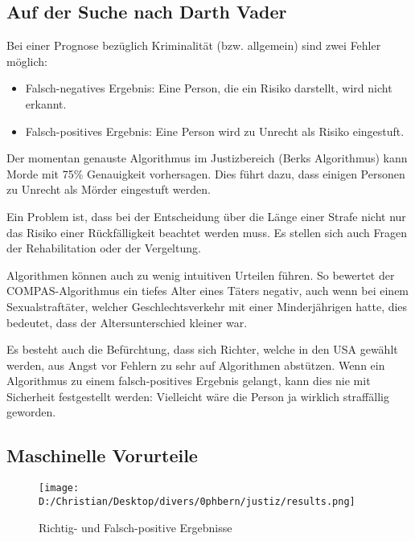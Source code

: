 \documentclass{article}
\begin{document}
\subsection*{Auf der Suche nach Darth Vader}

Bei einer Prognose bezüglich Kriminalität (bzw. allgemein) sind zwei Fehler möglich: 
 
		\begin{itemize}
			\item Falsch-negatives Ergebnis: Eine Person, die ein Risiko darstellt, 
						wird nicht erkannt. 		
			\item Falsch-positives Ergebnis: Eine Person wird zu Unrecht als 
						Risiko eingestuft. 
	\end{itemize}

Der momentan genauste Algorithmus im Justizbereich (Berks Algorithmus) kann Morde mit 75\% Genauigkeit vorhersagen. Dies führt dazu, dass einigen Personen zu Unrecht als Mörder eingestuft werden. 

Ein Problem ist, dass bei der Entscheidung über die Länge einer Strafe nicht nur das Risiko einer Rückfälligkeit beachtet werden muss. Es stellen sich auch Fragen der Rehabilitation oder der Vergeltung.  

Algorithmen können auch zu wenig intuitiven Urteilen führen. So bewertet der COMPAS-Algorithmus ein tiefes Alter eines Täters negativ, auch wenn bei einem Sexualstraftäter, welcher Geschlechtsverkehr mit einer Minderjährigen hatte, dies bedeutet, dass der Altersunterschied kleiner war. 

Es besteht auch die Befürchtung, dass sich Richter, welche in den USA gewählt werden, aus Angst vor Fehlern zu sehr auf Algorithmen abstützen. Wenn ein Algorithmus zu einem falsch-positives Ergebnis gelangt, kann dies nie mit Sicherheit festgestellt werden: Vielleicht wäre die Person ja wirklich straffällig geworden. 

\subsection*{Maschinelle Vorurteile} 

\begin{wrapfigure}{r}{0.6\textwidth}
	\centering
		\texttt{[image: D:/Christian/Desktop/divers/0phbern/justiz/results.png]}
		\caption{Richtig- und Falsch-positive Ergebnisse}
\end{wrapfigure}
\end{document}
